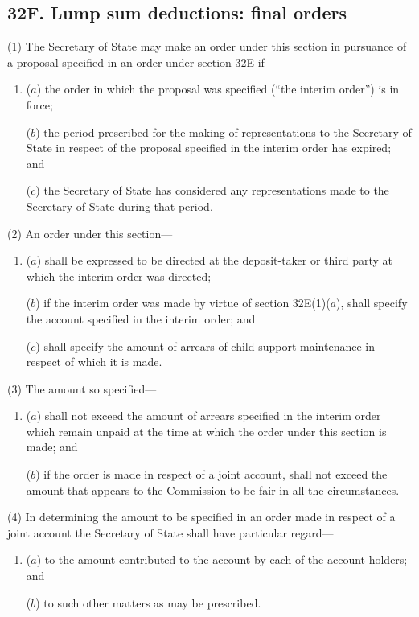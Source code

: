 \documentclass[12pt,a4paper]{article}
\begin{document}
\subsection{32F. Lump sum deductions: final orders}

(1) The Secretary of State may make an order under this section in pursuance of a proposal specified in an order under section 32E if---
\begin{enumerate}\item[]
($a$)
the order in which the proposal was specified (“the interim order”) is in force;

($b$)
the period prescribed for the making of representations to the Secretary of State in respect of the proposal specified in the interim order has expired; and

($c$)
the Secretary of State has considered any representations made to the Secretary of State during that period.
\end{enumerate}

(2) An order under this section---
\begin{enumerate}\item[]
($a$)
shall be expressed to be directed at the deposit-taker or third party at which the interim order was directed;

($b$)
if the interim order was made by virtue of section 32E(1)($a$), shall specify the account specified in the interim order; and

($c$)
shall specify the amount of arrears of child support maintenance in respect of which it is made.
\end{enumerate}

(3) The amount so specified---
\begin{enumerate}\item[]
($a$) shall not exceed the amount of arrears specified in the interim order which remain unpaid at the time at which the order under this section is made; and

($b$) if the order is made in respect of a joint account, shall not exceed the amount that appears to the Commission to be fair in all the circumstances.
\end{enumerate}

(4)
In determining the amount to be specified in an order made in respect of a joint account the Secretary of State shall have particular regard---
\begin{enumerate}\item[]
($a$) to the amount contributed to the account by each of the account-holders; and

($b$) to such other matters as may be prescribed.
\end{enumerate}
\end{document}
